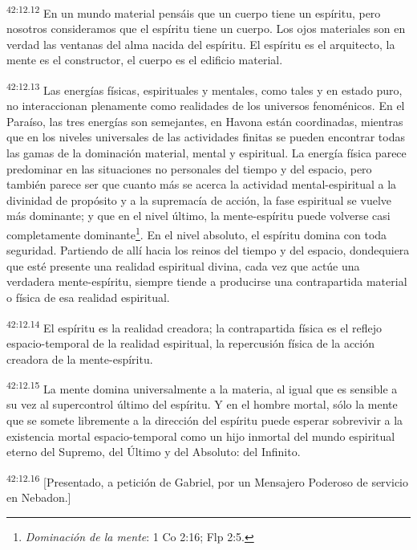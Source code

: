 \par
\textsuperscript{42:12.12} En un mundo material pensáis que un cuerpo tiene un espíritu, pero nosotros consideramos que el espíritu tiene un cuerpo. Los ojos materiales son en verdad las ventanas del alma nacida del espíritu. El espíritu es el arquitecto, la mente es el constructor, el cuerpo es el edificio material.

\par
\textsuperscript{42:12.13} Las energías físicas, espirituales y mentales, como tales y en estado puro, no interaccionan plenamente como realidades de los universos fenoménicos. En el Paraíso, las tres energías son semejantes, en Havona están coordinadas, mientras que en los niveles universales de las actividades finitas se pueden encontrar todas las gamas de la dominación material, mental y espiritual. La energía física parece predominar en las situaciones no personales del tiempo y del espacio, pero también parece ser que cuanto más se acerca la actividad mental-espiritual a la divinidad de propósito y a la supremacía de acción, la fase espiritual se vuelve más dominante; y que en el nivel último, la mente-espíritu puede volverse casi completamente dominante\footnote{\textit{Dominación de la mente}: 1 Co 2:16; Flp 2:5.}. En el nivel absoluto, el espíritu domina con toda seguridad. Partiendo de allí hacia los reinos del tiempo y del espacio, dondequiera que esté presente una realidad espiritual divina, cada vez que actúe una verdadera mente-espíritu, siempre tiende a producirse una contrapartida material o física de esa realidad espiritual.

\par
\textsuperscript{42:12.14} El espíritu es la realidad creadora; la contrapartida física es el reflejo espacio-temporal de la realidad espiritual, la repercusión física de la acción creadora de la mente-espíritu.

\par
\textsuperscript{42:12.15} La mente domina universalmente a la materia, al igual que es sensible a su vez al supercontrol último del espíritu. Y en el hombre mortal, sólo la mente que se somete libremente a la dirección del espíritu puede esperar sobrevivir a la existencia mortal espacio-temporal como un hijo inmortal del mundo espiritual eterno del Supremo, del Último y del Absoluto: del Infinito.

\par
\textsuperscript{42:12.16} [Presentado, a petición de Gabriel, por un Mensajero Poderoso de servicio en Nebadon.]